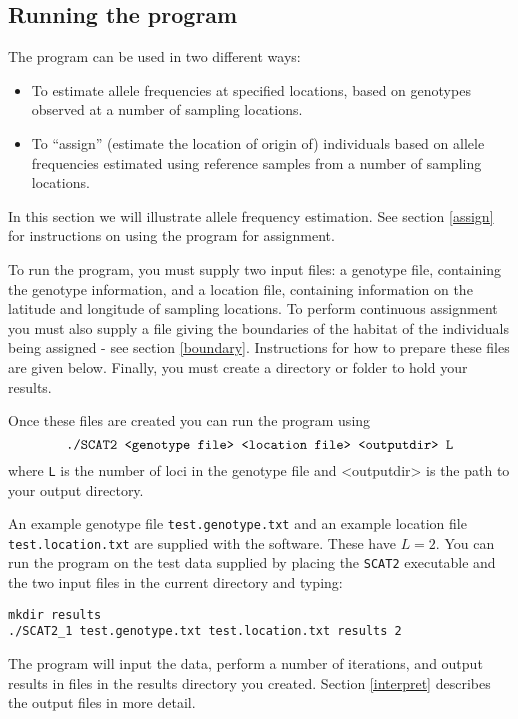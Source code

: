 \documentclass[10pt,titlepage,times,letterpaper]{article}
\def\SCAT{{\tt SCAT2} }
\begin{document}
\subsection{Running the program}

The program can be used in two different ways:
\begin{itemize}
\item To estimate allele frequencies at specified
locations, based on genotypes observed at a number of sampling
locations.
\item To ``assign'' (estimate the location of origin of)
individuals based on allele
frequencies estimated using reference samples from a number of
sampling locations.
\end{itemize}

In this section we will illustrate allele frequency estimation.
See section \ref{assign} for
instructions on using the program for assignment.

To run the program, you must supply two input files: a genotype file,
containing the genotype information, and a location file, containing
information on the latitude and longitude of sampling locations. To
perform continuous assignment you must also supply a file giving the
boundaries of the habitat of the individuals being assigned - see
section \ref{boundary}.  Instructions for how to prepare these files
are given below. Finally, you must create a directory or folder to hold your results.

Once these files are created you can run the program
using
$$\text{{\tt ./SCAT2 <genotype file> <location file> <outputdir> L}}$$ 
where {\tt L} is the number of loci in the genotype file and <outputdir>
is the path to your output directory.

An example genotype file {\tt test.genotype.txt}
and an example location file {\tt test.location.txt} are supplied with
the software.  These have $L=2$.  You can run the program on the test data supplied by placing
the \SCAT executable and the two input files in the current directory and typing:

{\flushleft
\tt{mkdir results}  \\
{\tt ./SCAT2\_1 test.genotype.txt test.location.txt results 2} \\
}

\medskip

The program will input the data, perform a number of iterations, and
output results in files in the results directory you created. 
Section \ref{interpret} describes the output files in more detail.
\end{document}
